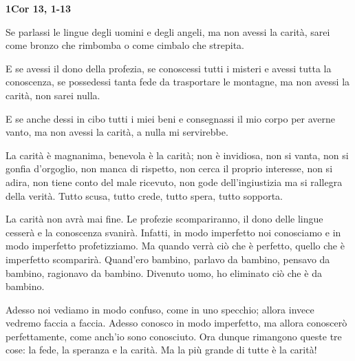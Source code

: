 \documentclass[landscape]{article}
\begin{document}
\pagestyle{empty}


\huge
\LobsterTwo

\textbf{1Cor 13, 1-13}

\vfill

Se parlassi le lingue degli uomini e degli angeli, ma non avessi 
la carit\`a, sarei come bronzo che rimbomba o come cimbalo che strepita.

\vfill

E se avessi il dono della profezia, se conoscessi tutti i misteri e avessi
tutta la conoscenza, se possedessi tanta fede da trasportare le montagne,
ma non avessi la carit\`a, non sarei nulla.

\vfill

E se anche dessi in cibo tutti i miei beni e consegnassi il mio corpo
per averne vanto, ma non avessi la carit\`a, a nulla mi servirebbe.

\vfill

La carit\`a \`e magnanima, benevola \`e la carit\`a; non \`e invidiosa,
non si vanta, non si gonfia d'orgoglio, non manca di rispetto, non
cerca il proprio interesse, non si adira, non tiene conto del male 
ricevuto, non gode dell'ingiustizia ma si rallegra della verit\`a. 
Tutto scusa, tutto crede, tutto spera, tutto sopporta.

\vfill

La carit\`a non avr\`a mai fine. Le profezie scompariranno, il dono
delle lingue cesser\`a e la conoscenza svanir\`a. Infatti, in modo
imperfetto noi conosciamo e in modo imperfetto profetizziamo. Ma quando
verr\`a ci\`o che \`e perfetto, quello che \`e imperfetto scomparir\`a.
Quand'ero bambino, parlavo da bambino, pensavo da bambino, ragionavo da 
bambino. Divenuto uomo, ho eliminato ci\`o che \`e da bambino.

\vfill

Adesso noi vediamo in modo confuso, come in uno specchio; allora
invece vedremo faccia a faccia. Adesso conosco in modo imperfetto,
ma allora conoscer\`o perfettamente, come anch'io sono conosciuto.
Ora dunque rimangono queste tre cose: la fede, la speranza e la carit\`a.
Ma la pi\`u grande di tutte \`e la carit\`a!

\vfill
\end{document}
